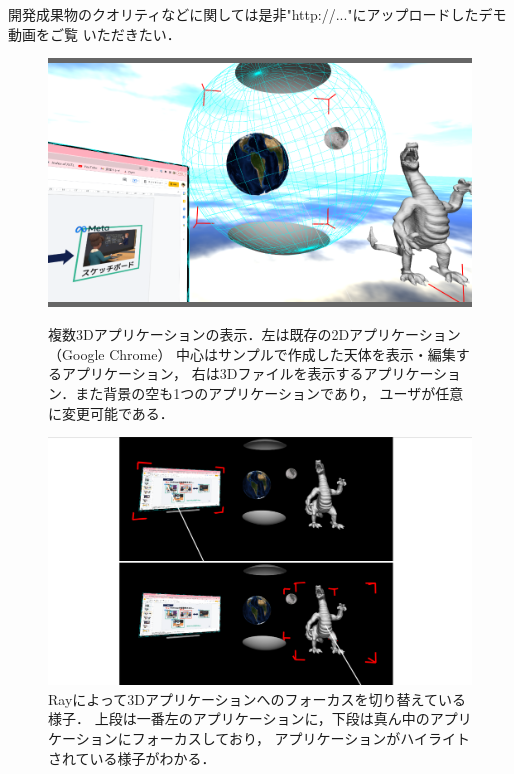 開発成果物のクオリティなどに関しては是非"http://..."にアップロードしたデモ動画をご覧
いただきたい． %


\begin{figure}[htbp]
  \begin{minipage}[t]{0.50\linewidth}
    \centering
    \includegraphics[keepaspectratio, width=\linewidth]{fig/multi-app.png}
    \caption{
      複数3Dアプリケーションの表示．左は既存の2Dアプリケーション（Google Chrome）
      中心はサンプルで作成した天体を表示・編集するアプリケーション，
      右は3Dファイルを表示するアプリケーション．また背景の空も1つのアプリケーションであり，
      ユーザが任意に変更可能である．
    }
    \label{fig:multi-app}
  \end{minipage}
  \begin{minipage}[t]{0.50\linewidth}
    \centering
    \includegraphics[keepaspectratio, width=\linewidth]{fig/ray-input.png}
    \caption{
      Rayによって3Dアプリケーションへのフォーカスを切り替えている様子．
      上段は一番左のアプリケーションに，下段は真ん中のアプリケーションにフォーカスしており，
      アプリケーションがハイライトされている様子がわかる．
    }
    \label{fig:ray-input}
  \end{minipage}
\end{figure}

